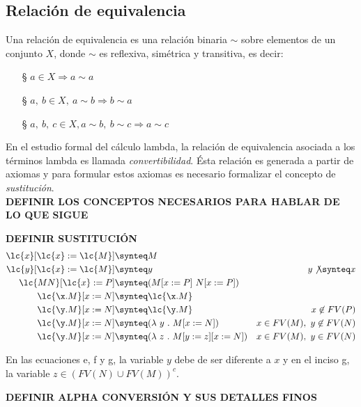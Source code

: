 \subsection{Relación de equivalencia} \label{sec:1.2.2}

Una relación de equivalencia es una relación binaria \(\sim\) sobre elementos de un
conjunto \(X\), donde \(\sim\) es reflexiva, simétrica y transitiva, es decir:

\begin{itemize}
\item[\S] \(a\in X \Rightarrow a\sim a\)
\item[\S] \(a,\ b\in X,\ a\sim b \Rightarrow b\sim a \)
\item[\S] \(a,\ b,\ c\in X, a\sim b,\ b\sim c \Rightarrow a\sim c\)
\end{itemize}

En el estudio formal del cálculo lambda, la relación de equivalencia asociada a
los términos lambda es llamada \emph{convertibilidad}. Ésta relación es generada
a partir de axiomas y para formular estos axiomas es necesario formalizar el
concepto de \emph{sustitución}.\\

\textbf{DEFINIR LOS CONCEPTOS NECESARIOS PARA HABLAR DE LO QUE SIGUE}

\textbf{DEFINIR SUSTITUCIÓN}\\

\begin{align}
  \lc{x}[\lc{x}:=\lc{M}] &\synteq M                       &\\
  \lc{y}[\lc{x}:=\lc{M}] &\synteq y                       &y \not\synteq x\\
  \lc{M N}[\lc{x}:=P] &\synteq (M[x:=P]\ N[x:=P])         &\\
  \lc{\x.M}[x:=N] &\synteq \lc{\x.M}                      &\\
  \lc{\y.M}[x:=N] &\synteq \lc{\y.M}                      &x \not\in FV(P)\\
  \lc{\y.M}[x:=N] &\synteq (\lambda\ y\ .\ M[x:=N])       &x\in FV(M),\ y\not\in FV(N)\\
  \lc{\y.M}[x:=N] &\synteq (\lambda\ z\ .\ M[y:=z][x:=N]) &x\in FV(M),\ y\in FV(N)
\end{align}

En las ecuaciones e, f y g, la variable $y$ debe de ser diferente a $x$ y en el
inciso g, la variable $z \in (FV(N) \cup FV(M))^c$.


\textbf{DEFINIR ALPHA CONVERSIÓN Y SUS DETALLES FINOS}\\


